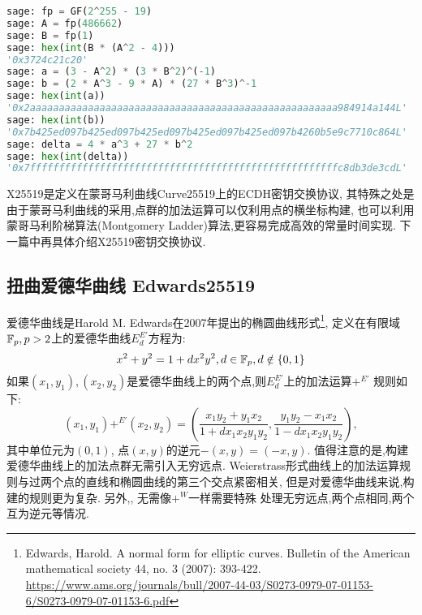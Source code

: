 \begin{lstlisting}[language = python, caption = Curve25519曲线的short-Weierstrass形式的曲线参数,label=lst-curve25519-sw]
sage: fp = GF(2^255 - 19)
sage: A = fp(486662)
sage: B = fp(1)
sage: hex(int(B * (A^2 - 4)))
'0x3724c21c20'
sage: a = (3 - A^2) * (3 * B^2)^(-1)
sage: b = (2 * A^3 - 9 * A) * (27 * B^3)^-1
sage: hex(int(a))
'0x2aaaaaaaaaaaaaaaaaaaaaaaaaaaaaaaaaaaaaaaaaaaaaaaaaaaaa984914a144L'
sage: hex(int(b))
'0x7b425ed097b425ed097b425ed097b425ed097b425ed097b4260b5e9c7710c864L'
sage: delta = 4 * a^3 + 27 * b^2
sage: hex(int(delta))
'0x7fffffffffffffffffffffffffffffffffffffffffffffffffffffc8db3de3cdL'
\end{lstlisting}

X25519是定义在蒙哥马利曲线Curve25519上的ECDH密钥交换协议,
其特殊之处是由于蒙哥马利曲线的采用,点群的加法运算可以仅利用点的横坐标构建,
也可以利用蒙哥马利阶梯算法(Montgomery Ladder)算法,更容易完成高效的常量时间实现.
下一篇中再具体介绍X25519密钥交换协议.

\subsection{扭曲爱德华曲线 Edwards25519}

爱德华曲线是Harold M. Edwards在2007年提出的椭圆曲线形式\footnote{
Edwards, Harold. 
A normal form for elliptic curves. 
Bulletin of the American mathematical society 44, no. 3 (2007): 393-422.
\url{https://www.ams.org/journals/bull/2007-44-03/S0273-0979-07-01153-6/S0273-0979-07-01153-6.pdf}},
定义在有限域$\mathbb{F}_p, p>2$上的爱德华曲线$E_{d}^{E'}$方程为:
$$
x^2+y^2 = 1 + dx^2y^2, d \in \mathbb{F}_p, d \notin \{0,1\}
$$
如果$(x_1,y_1), (x_2, y_2)$是爱德华曲线上的两个点,则$E_{d}^{E'}$上的加法运算$+^{E'}$
规则如下:
$$
(x_1, y_1) +^{E'} (x_2, y_2) = \left( \frac{x_1y_2 + y_1x_2}{1 + dx_1x_2y_1y_2}, \frac{y_1y_2 - x_1x_2}{1-dx_1x_2y_1y_2} \right),
$$
其中单位元为$(0,1)$, 点$(x,y)$的逆元$-(x,y) = (-x,y)$.
值得注意的是,构建爱德华曲线上的加法点群无需引入无穷远点.
Weierstrass形式曲线上的加法运算规则与过两个点的直线和椭圆曲线的第三个交点紧密相关,
但是对爱德华曲线来说,构建的规则更为复杂.
另外,, 无需像$+^W$一样需要特殊
处理无穷远点,两个点相同,两个互为逆元等情况.

